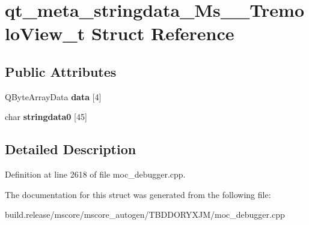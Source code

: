 \hypertarget{structqt__meta__stringdata___ms_____tremolo_view__t}{}\section{qt\+\_\+meta\+\_\+stringdata\+\_\+\+Ms\+\_\+\+\_\+\+Tremolo\+View\+\_\+t Struct Reference}
\label{structqt__meta__stringdata___ms_____tremolo_view__t}
\subsection*{Public Attributes}
\begin{DoxyCompactItemize}
\item 
\mbox{\label{structqt__meta__stringdata___ms_____tremolo_view__t_a1e40c129113d5e5bfe22989fde7e2a6f}} 
Q\+Byte\+Array\+Data {\bfseries data} \mbox{[}4\mbox{]}
\item 
\mbox{\label{structqt__meta__stringdata___ms_____tremolo_view__t_a88fea40895b0713658b066f6cbabe520}} 
char {\bfseries stringdata0} \mbox{[}45\mbox{]}
\end{DoxyCompactItemize}


\subsection{Detailed Description}


Definition at line 2618 of file moc\+\_\+debugger.\+cpp.



The documentation for this struct was generated from the following file\+:\begin{DoxyCompactItemize}
\item 
build.\+release/mscore/mscore\+\_\+autogen/\+T\+B\+D\+D\+O\+R\+Y\+X\+J\+M/moc\+\_\+debugger.\+cpp\end{DoxyCompactItemize}
